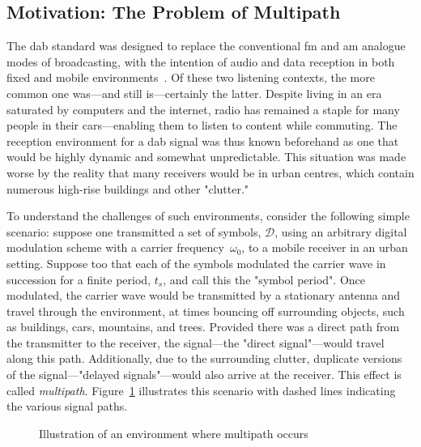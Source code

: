 \documentclass[class=report,11pt,crop=false]{standalone}
\begin{document}
\subsection{Motivation: The Problem of Multipath \label{subsect:multipath}}

The \gls{dab} standard was designed to replace the conventional \gls{fm} and \gls{am} analogue modes of broadcasting, with the intention of audio and data reception in both fixed and mobile environments~\cite{dabstandard}. Of these two listening contexts, the more common one was---and still is---certainly the latter. Despite living in an era saturated by computers and the internet, radio has remained a staple for many people in their cars---enabling them to listen to content while commuting. The reception environment for a \gls{dab} signal was thus known beforehand as one that would be highly dynamic and somewhat unpredictable. This situation was made worse by the reality that many receivers would be in urban centres, which contain numerous high-rise buildings and other "clutter."

To understand the challenges of such environments, consider the following simple scenario: suppose one transmitted a set of symbols, \(\mathcal{D}\), using an arbitrary digital modulation scheme with a carrier frequency~\(\omega_0\), to a mobile receiver in an urban setting. Suppose too that each of the symbols modulated the carrier wave in succession for a finite period, \(t_s\), and call this the "symbol period". Once modulated, the carrier wave would be transmitted by a stationary antenna and travel through the environment, at times bouncing off surrounding objects, such as buildings, cars, mountains, and trees. Provided there was a direct path from the transmitter to the receiver, the signal---the "direct signal"---would travel along this path. Additionally, due to the surrounding clutter, duplicate versions of the signal---"delayed signals"---would also arrive at the receiver. This effect is called \emph{multipath}. Figure~\ref{fig:multipath-illustration} illustrates this scenario with dashed lines indicating the various signal paths.

\begin{figure}[htbp]
    \centering
    \captionsetup{type=figure}
    \def\svgwidth{0.8\linewidth}
    { %
    \scriptsize
        }
    \caption{Illustration of an environment where multipath occurs}
    \label{fig:multipath-illustration}
\end{figure}
\end{document}
